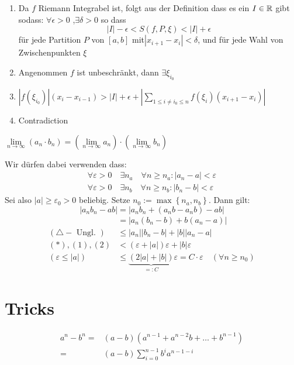 \begin{enumerate}
\item Da $f$ Riemann Integrabel ist, folgt aus der Definition dass es ein $I\in \mathbb{R}$ gibt sodass: $\forall \epsilon > 0$ ,$\exists \delta > 0$ so dass $$|I|-\epsilon<S(f, P, \xi)<|I|+\epsilon$$ für jede Partition 
	$P$ von $[a,b]$ mit$\left|x_{i+1}-x_{i}\right|<\delta$, und für jede Wahl von Zwischenpunkten $\xi$
\item Angenommen $f$ ist unbeschränkt, dann $\exists \xi_{i_0}$ 
\item $\left|f\left(\xi_{i_{0}}\right)\right|\left(x_{i}-x_{i-1}\right)>|I|+\epsilon+\left|\sum_{1 \leq i \neq i_{0} \leq n} f\left(\xi_{i}\right)\left(x_{i+1}-x_{i}\right)\right|$
\item Contradiction
\end{enumerate}

\Beweis $\lim \limits_{n \rightarrow \infty} (a_n \cdot b_n) = (\lim \limits_{n \rightarrow \infty} a_n) \cdot (\lim \limits_{n \rightarrow \infty}  b_n)$

Wir dürfen dabei verwenden dass:
\[
\begin{array}{l}
\forall \varepsilon>0 \quad \exists n_{a} \quad \forall n \geq n_{a}:\left|a_{n}-a\right|<\varepsilon \\
\forall \varepsilon>0 \quad \exists n_{b} \quad \forall n \geq n_{b}:\left|b_{n}-b\right|<\varepsilon
\end{array}
\]
Sei also $|a| \geq \varepsilon_{0}>0$ beliebig. Setze $n_{0}:=\max \left\{n_{a}, n_{b}\right\} .$ Dann gilt:
\[
\left|a_{n} b_{n}-a b\right|=\left|a_{n} b_{n}+\left(a_{n} b-a_{n} b\right)-a b\right|
\]
\[
\begin{aligned}
&=\left|a_{n}\left(b_{n}-b\right)+b\left(a_{n}-a\right)\right| \\
(\triangle-\text { Ungl. }) & \leq\left|a_{n}\right|\left|b_{n}-b\right|+|b|\left|a_{n}-a\right| \\
(*),(1),(2) &<(\varepsilon+|a|) \varepsilon+|b| \varepsilon \\
(\varepsilon \leq|a|) & \leq \underbrace{(2|a|+|b|)}_{=: C} \varepsilon=C \cdot \varepsilon \quad\left(\forall n \geq n_{0}\right)
\end{aligned}
\]

\section{Tricks}
\Trick
\begin{align*}
a^n-b^n =& (a-b)(a^{n-1} + a^{n-2} b +\dots+b^{n-1}) \\
		=& (a-b)\sum_{i=0}^{n-1} b^{i}a^{n-1-i} 
\end{align*}

